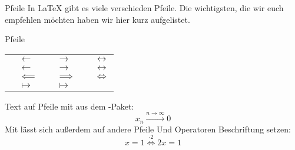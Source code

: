 
\begin{frame}[fragile]{Pfeile}
In \LaTeX{} gibt es viele verschieden Pfeile. Die wichtigsten, die wir euch empfehlen möchten haben wir hier kurz aufgelistet. 
\begin{block}{Pfeile}
\centering
\scriptsize
\begin{tabular}{*{3}{|rl}|}\hline
		 & $\leftarrow$ & 
		 & $\rightarrow$ &
		 & $\leftrightarrow$ \\
		 & $\longleftarrow$ & 
		 & $\longrightarrow$ &
		 & $\longleftrightarrow$ \\
		 & $\impliedby$ & 
		 & $\implies$ &
		 & $\iff$ \\
		 & $\mapsto$ & 
		 & $\longmapsto$ & 
		& \\ \hline
\end{tabular}
\end{block}\pause
Text auf Pfeile mit  aus dem -Paket:
\[
    x_n\xrightarrow{n\rightarrow\infty}0
\]
Mit  lässt sich außerdem auf andere Pfeile Und Operatoren Beschriftung setzen: 
\[
    x=1 \overset{\cdot2}{\iff} 2x=1
\]
\end{frame}